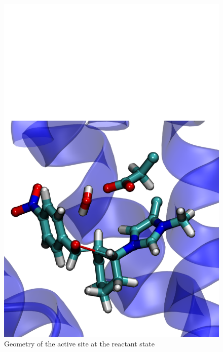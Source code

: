 \documentclass[%
preprint,
 amsmath,amssymb,
 aps,
prb,
]{revtex4-2}
\begin{document}
\begin{figure}[ht!]
\centering
\begin{minipage}[b]{.4\textwidth}
\includegraphics[scale=0.27]{figures/reac-61.pdf}
\caption{Geometry of the active site at the reactant state}\label{fig:reac61}
\end{minipage}\qquad
\begin{minipage}[b]{.4\textwidth}

\end{minipage}
\end{figure}
\end{document}
